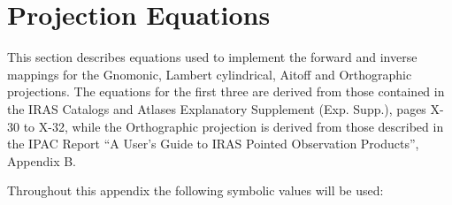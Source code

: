 \section {Projection Equations}
\label {APP:PROJ}

This section describes equations used to implement the forward and inverse
mappings for the Gnomonic, Lambert cylindrical, Aitoff and Orthographic
projections. The equations for the first three are derived from those contained
in the IRAS Catalogs and Atlases Explanatory Supplement (Exp. Supp.), pages X-30
to X-32, while the Orthographic projection is derived from those described in
the IPAC Report ``A User's Guide to IRAS Pointed Observation Products'',
Appendix B. 

Throughout this appendix the following symbolic values will be used:

